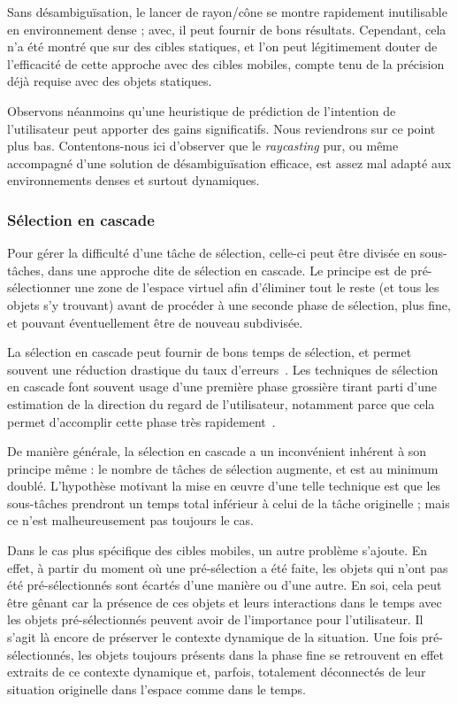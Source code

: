     Sans désambiguïsation, le lancer de rayon/cône se montre rapidement inutilisable en environnement dense ; avec, il peut fournir de bons résultats. Cependant, cela n'a été montré que sur des cibles statiques, et l'on peut légitimement douter de l'efficacité de cette approche avec des cibles mobiles, compte tenu de la précision déjà requise avec des objets statiques.
    
    Observons néanmoins qu'une heuristique de prédiction de l'intention de l'utilisateur peut apporter des gains significatifs. Nous reviendrons sur ce point plus bas. Contentons-nous ici d'observer que le \emph{raycasting} pur, ou même accompagné d'une solution de désambiguïsation efficace, est assez mal adapté aux environnements denses et surtout dynamiques.
    
	\subsubsection{Sélection en cascade}
    Pour gérer la difficulté d'une tâche de sélection, celle-ci peut être divisée en sous-tâches, dans une approche dite de sélection en cascade. Le principe est de pré-sélectionner une zone de l'espace virtuel afin d'éliminer tout le reste (et tous les objets s'y trouvant) avant de procéder à une seconde phase de sélection, plus fine, et pouvant éventuellement être de nouveau subdivisée.
    
    La sélection en cascade peut fournir de bons temps de sélection, et permet souvent une réduction drastique du taux d'erreurs~\cite{kopper2011rapid}. Les techniques de sélection en cascade font souvent usage d'une première phase grossière tirant parti d'une estimation de la direction du regard de l'utilisateur, notamment parce que cela permet d'accomplir cette phase très rapidement~\cite{debarba2013disambiguation}.
    
    De manière générale, la sélection en cascade a un inconvénient inhérent à son principe même : le nombre de tâches de sélection augmente, et est au minimum doublé. L'hypothèse motivant la mise en \oe{}uvre d'une telle technique est que les sous-tâches prendront un temps total inférieur à celui de la tâche originelle ; mais ce n'est malheureusement pas toujours le cas.
    
    Dans le cas plus spécifique des cibles mobiles, un autre problème s'ajoute. En effet, à partir du moment où une pré-sélection a été faite, les objets qui n'ont pas été pré-sélectionnés sont écartés d'une manière ou d'une autre. En soi, cela peut être gênant car la présence de ces objets et leurs interactions dans le temps avec les objets pré-sélectionnés peuvent avoir de l'importance pour l'utilisateur. Il s'agit là encore de préserver le contexte dynamique de la situation. Une fois pré-sélectionnés, les objets toujours présents dans la phase fine se retrouvent en effet extraits de ce contexte dynamique et, parfois, totalement déconnectés de leur situation originelle dans l'espace comme dans le temps.
    
